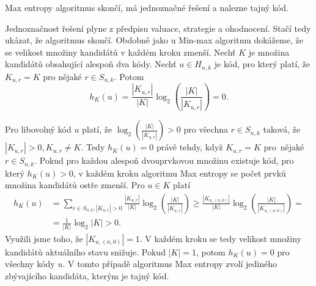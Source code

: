 \begin{tvrz}
    Max entropy algoritmus skončí, má jednoznačné řešení a nalezne tajný kód.
\end{tvrz}
\begin{dukaz}
    Jednoznačnost řešení plyne z předpisu valuace, strategie a ohodnocení. Stačí tedy ukázat, že algoritmus skončí. Obdobně jako u Min-max algoritmu dokážeme, že se velikost množiny kandidátů v každém kroku zmenší. Nechť $K$ je množina kandidátů obsahující alespoň dva kódy. 
    Nechť $u\in H_{n,k}$ je kód, pro který platí, že $K_{u,r} = K$ pro nějaké $r\in S_{n,k}$. Potom 
    \[h_K(u) = \frac{|K_{u,r}|}{|K|}\log_2\left( \frac{|K|}{|K_{u,r}|} \right) = 0.\]
    
    Pro libovolný kód $u$ platí, že $\log_2\left( \frac{|K|}{|K_{u,r}|} \right)  > 0 $ pro všechna $r\in S_{n,k}$ taková, že $|K_{u,r}| > 0, K_{u,r} \neq K$. Tedy $h_K(u) = 0$ právě tehdy, když $K_{u,r} = K$ pro~nějaké $r\in S_{n,k}$. Pokud pro každou alespoň dvouprvkovou množinu existuje kód, pro který $h_K(u) > 0$, v každém kroku algoritmu Max entropy se počet prvků množina kandidátů ostře zmenší. Pro $u \in K$ platí
    \begin{align*}
        h_K(u) &= \sum_{r\in S_{n,k}, |K_{u,r}| > 0} \frac{|K_{u,r}|}{|K|}\log_2\left( \frac{|K|}{|K_{u,r}|} \right) 
    \geq 
    \frac{|K_{u,(n,0)}|}{|K|}\log_2\left( \frac{|K|}{|K_{u,(n,0)}|} \right)
    = \\
    &=\frac{1}{|K|} \log_2 |K| > 0.
    \end{align*}
    Využili jsme toho, že $|K_{u,(n,0)}| = 1$. V každém kroku se tedy velikost množiny kandidátů aktuálního stavu snižuje. Pokud $|K| = 1$, potom $h_K(u) = 0$ pro všechny kódy $u$. V tomto případě algoritmus Max entropy zvolí jediného zbývajícího kandidáta, kterým je tajný kód. 
    
\end{dukaz}

